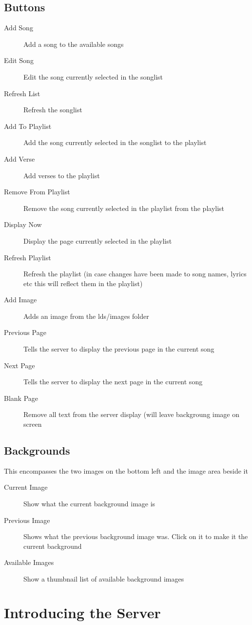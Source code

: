 \documentclass[11pt,twoside]{book}
\begin{document}
\subsection{Buttons}
	\begin{description}
		\item[Add Song] Add a song to the available songs
		\item[Edit Song] Edit the song currently selected in the songlist
		\item[Refresh List]Refresh the songlist
		\item[Add To Playlist]Add the song currently selected in the songlist to the playlist
		\item[Add Verse]Add verses to the playlist
		\item[Remove From Playlist] Remove the song currently selected in the playlist from the playlist
		\item[Display Now] Display the page currently selected in the playlist
		\item[Refresh Playlist] Refresh the playlist (in case changes have been made to song names, lyrics etc this will reflect them in the playlist)
		\item[Add Image] Adds an image from the lds/images folder
		\item[Previous Page] Tells the server to display the previous page in the current song
		\item[Next Page] Tells the server to display the next page in the current song
		\item[Blank Page] Remove all text from the server display (will leave backgroung image on screen
	\end{description}

\subsection{Backgrounds}
	This encompasses the two images on the bottom left and the image area beside it
	\begin{description}
		\item[Current Image] Show what the current background image is
		\item[Previous Image] Shows what the previous background image was. Click on it to make it the current background
		\item[Available Images] Show a thumbnail list of available background images
	\end{description}


\section{Introducing the Server}
\end{document}
